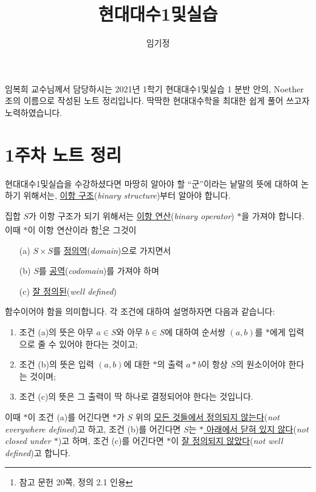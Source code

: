 \documentclass[12pt]{paper}
\title{현대대수1및실습}
\author{임기정}
\begin{document}
  \nocite{fraleigh2009}

  \maketitle
  \hspace{12pt}
  
  임복희 교수님께서 담당하시는 2021년 1학기 현대대수1및실습 1 분반 안의, Noether 조의 이름으로 작성된 노트 정리입니다.
  딱딱한 현대대수학을 최대한 쉽게 풀어 쓰고자 노력하였습니다.

  \section{1주차 노트 정리}
  \hspace{12pt}

  현대대수1및실습을 수강하셨다면 마땅히 알아야 할 ``군''이라는 낱말의 뜻에 대하여 논하기 위해서는, \underline{이항 구조}(\textit{binary structure})부터 알아야 합니다.

  집합 $S$가 이항 구조가 되기 위해서는 \underline{이항 연산}(\textit{binary operator}) $*$을 가져야 합니다.
  이때 $*$이 이항 연산이라 함\footnote{참고 문헌 \cite{fraleigh2009} 20쪽, 정의 2.1 인용}은 그것이
  \begin{enumerate}
    \item[(a)] $S \times S$를 \underline{정의역}(\textit{domain})으로 가지면서
    \item[(b)] $S$를 \underline{공역}(\textit{codomain})를 가져야 하며
    \item[(c)] \underline{잘 정의된}(\textit{well defined}) 
  \end{enumerate}
  함수이어야 함을 의미합니다.
  각 조건에 대하여 설명하자면 다음과 같습니다:
  \begin{enumerate}
    \item 조건 (a)의 뜻은 아무 $a \in S$와 아무 $b \in S$에 대하여 순서쌍 $\left( a , b \right)$를 $*$에게 입력으로 줄 수 있어야 한다는 것이고;
    \item 조건 (b)의 뜻은 입력 $\left( a , b \right)$에 대한 $*$의 출력 $a * b$이 항상 $S$의 원소이어야 한다는 것이며;
    \item 조건 (c)의 뜻은 그 출력이 딱 하나로 결정되어야 한다는 것입니다.
  \end{enumerate}
  
  이때 $*$이 조건 (a)를 어긴다면 $*$가 $S$ 위의 \underline{모든 것들에서 정의되지 않는다}(\textit{not everywhere defined})고 하고,
  조건 (b)를 어긴다면 $S$는 \underline{$*$ 아래에서 닫혀 있지 않다}(\textit{not closed under $*$})고 하며,
  조건 (c)를 어긴다면 $*$이 \underline{잘 정의되지 않았다}(\textit{not well defined})고 합니다.
\end{document}
